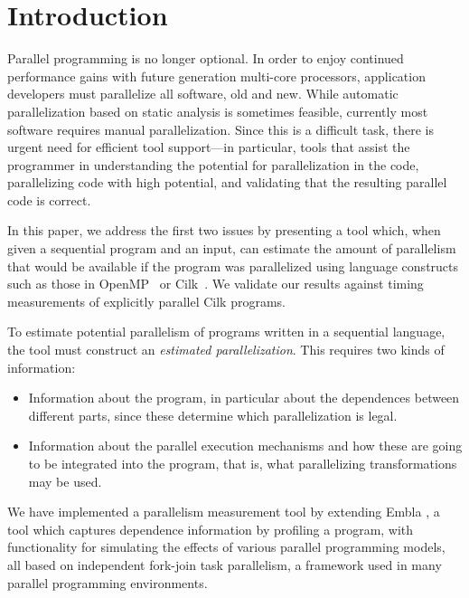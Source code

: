 \section{Introduction}

Parallel programming is no longer optional.  In order to enjoy continued
performance gains with future generation multi-core processors,
application developers must parallelize all software, old and
new.
While automatic parallelization based on static analysis 
is sometimes feasible, currently most software requires manual
parallelization.
Since this is a difficult task, there is urgent need for efficient tool support---in
particular, tools that assist the programmer in understanding the potential 
for parallelization in the code, parallelizing code with high potential, 
and validating that the resulting parallel code is correct.

In this paper, we address the first two issues by presenting a tool
which, when given a sequential program and an input, can estimate the 
amount of parallelism that would be available if the program was parallelized
using language constructs such as those in OpenMP~\cite{dagum98openmp}
or Cilk~\cite{blumofe96cilk}. We validate our results against timing 
measurements of explicitly parallel Cilk programs.

To estimate potential parallelism of programs written
in a sequential language, the tool must construct
an {\em estimated parallelization}. This requires two kinds of information:
\begin{itemize}
\item
Information about the program, in particular about the dependences between 
different parts, since these determine which parallelization is legal.
\item
Information about the parallel execution mechanisms and how these are going
to be integrated into the program, that is, what parallelizing transformations 
may be used.
\end{itemize}
We have implemented a parallelism measurement tool by extending
Embla \cite{embla:08}, a tool which captures dependence information by 
profiling a program, with functionality for simulating the effects of various parallel 
programming models, all based on independent fork-join task parallelism,
a framework used in many parallel programming environments.

